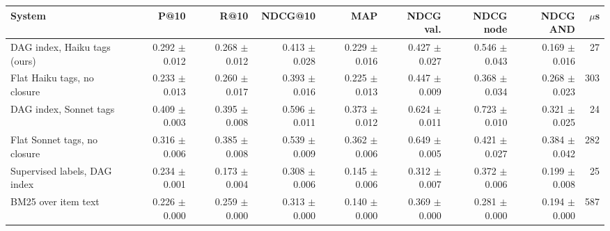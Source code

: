 \setlength{\tabcolsep}{3pt}
\begin{tabular}{@{}lrrrrrrrr@{}}
    \toprule
    System & P@10 & R@10 & NDCG@10 & MAP & NDCG val. & NDCG node & NDCG AND & $\mu$s \\
    \midrule
    DAG index, Haiku tags (ours) & 0.292 $\pm$ 0.012 & 0.268 $\pm$ 0.012 & 0.413 $\pm$ 0.028 & 0.229 $\pm$ 0.016 & 0.427 $\pm$ 0.027 & 0.546 $\pm$ 0.043 & 0.169 $\pm$ 0.016 & 27 \\
    Flat Haiku tags, no closure & 0.233 $\pm$ 0.013 & 0.260 $\pm$ 0.017 & 0.393 $\pm$ 0.016 & 0.225 $\pm$ 0.013 & 0.447 $\pm$ 0.009 & 0.368 $\pm$ 0.034 & 0.268 $\pm$ 0.023 & 303 \\
    DAG index, Sonnet tags & 0.409 $\pm$ 0.003 & 0.395 $\pm$ 0.008 & 0.596 $\pm$ 0.011 & 0.373 $\pm$ 0.012 & 0.624 $\pm$ 0.011 & 0.723 $\pm$ 0.010 & 0.321 $\pm$ 0.025 & 24 \\
    Flat Sonnet tags, no closure & 0.316 $\pm$ 0.006 & 0.385 $\pm$ 0.008 & 0.539 $\pm$ 0.009 & 0.362 $\pm$ 0.006 & 0.649 $\pm$ 0.005 & 0.421 $\pm$ 0.027 & 0.384 $\pm$ 0.042 & 282 \\
    Supervised labels, DAG index & 0.234 $\pm$ 0.001 & 0.173 $\pm$ 0.004 & 0.308 $\pm$ 0.006 & 0.145 $\pm$ 0.006 & 0.312 $\pm$ 0.007 & 0.372 $\pm$ 0.006 & 0.199 $\pm$ 0.008 & 25 \\
    BM25 over item text & 0.226 $\pm$ 0.000 & 0.259 $\pm$ 0.000 & 0.313 $\pm$ 0.000 & 0.140 $\pm$ 0.000 & 0.369 $\pm$ 0.000 & 0.281 $\pm$ 0.000 & 0.194 $\pm$ 0.000 & 587 \\
    \bottomrule
\end{tabular}
